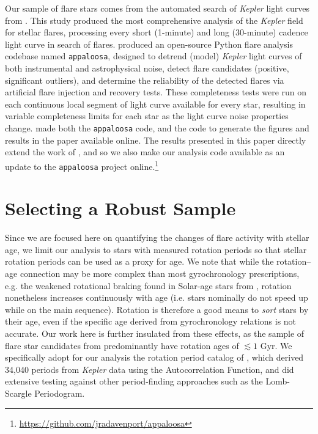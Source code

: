\documentclass[preprint2]{aastex62}
\newcommand{\Kepler}{\textsl{Kepler}\xspace}
\begin{document}
Our sample of flare stars comes from the automated search of \Kepler light curves from \citet{davenport2016}. This study produced the most comprehensive analysis of the \Kepler field for stellar flares, processing every short (1-minute) and long (30-minute) cadence light curve in search of flares. \citet{davenport2016} produced an open-source Python flare analysis codebase named {\tt appaloosa}, designed to detrend (model) \Kepler light curves of both instrumental and astrophysical noise, detect flare candidates (positive, significant outliers), and determine the reliability of the detected flares via artificial flare injection and recovery tests. These completeness tests were run on each continuous local segment of light curve available for every star, resulting in variable completeness limits for each star as the light curve noise properties change. \citet{davenport2016} made both the {\tt appaloosa} code, and the code to generate the figures and results in the paper available online. The results presented in this paper directly extend the work of \citet{davenport2016}, and so we also make our analysis code available as an update to the {\tt appaloosa} project online.\footnote{\url{https://github.com/jradavenport/appaloosa}}


\section{Selecting a Robust Sample}

Since we are focused here on quantifying the changes of flare activity with stellar age, we limit our analysis to stars with measured rotation periods so that stellar rotation periods can be used as a proxy for age. We note that while the rotation--age connection may be more complex than most gyrochronology prescriptions, e.g. the weakened rotational braking found in Solar-age stars from \citet{van-saders2016}, rotation nonetheless increases continuously with age (i.e. stars nominally do not speed up while on the main sequence). Rotation is therefore a good means to {\it sort} stars by their age, even if the specific age derived from gyrochronology relations is not accurate. Our work here is further insulated from these effects, as the sample of flare star candidates from \citet{davenport2016} predominantly have rotation ages of $\lesssim 1$ Gyr. We specifically adopt for our analysis the rotation period catalog of \citet{mcquillan2014}, which derived 34,040 periods from \Kepler data using the Autocorrelation Function, and did extensive testing against other period-finding approaches such as the Lomb-Scargle Periodogram. 
\end{document}
